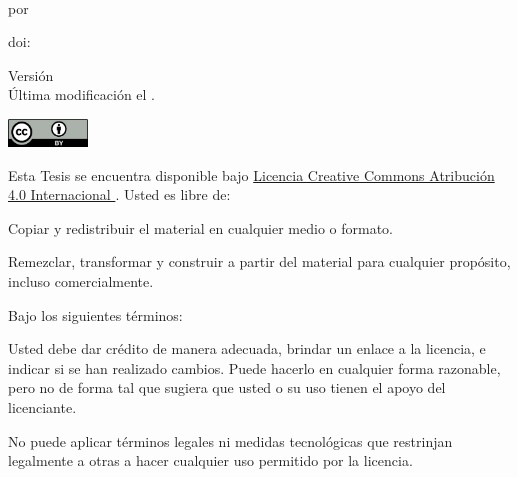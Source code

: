 \documentclass[11pt,a4paper,oneside,openright]{book}
\begin{document}
\title{\Title}
\author{\Soler}
\date{
    \normalsize
}

\frontmatter

\maketitle


\clearpage

\vspace*{\fill}


\noindent \textit{\Title{}} \\
por \Soler{}


\noindent doi: \href{https://doi.org/\ThesisDOI}{\ThesisDOI}

\vspace{4em}


\noindent Versión \ThesisVersion{} \\
Última modificación el .

\vspace{5em}

\noindent \includegraphics[height=2em]{figs/logos/cc-by.png}

\noindent Esta Tesis se encuentra disponible bajo
\href{
    https://creativecommons.org/licenses/by/4.0/deed.es
}{
    Licencia Creative Commons Atribución 4.0 Internacional
}.
Usted es libre de:

\begin{description}[labelindent=0.5cm]
    \item[Compartir:]{
        Copiar y redistribuir el material en cualquier medio o formato.
    }
    \item[Adaptar:]{
        Remezclar, transformar y construir a partir del material
        para cualquier propósito, incluso comercialmente.
    }
\end{description}

\noindent Bajo los siguientes términos:

\begin{description}[labelindent=0.5cm]
    \item[Atribución:]{
        Usted debe dar crédito de manera adecuada, brindar un enlace a la
        licencia, e indicar si se han realizado cambios. Puede hacerlo en cualquier
        forma razonable, pero no de forma tal que sugiera que usted o su uso tienen el
        apoyo del licenciante.
    }
    \item[No hay restricciones adicionales:]{
        No puede aplicar términos legales ni medidas tecnológicas que
        restrinjan legalmente a otras a hacer cualquier uso permitido por la
        licencia.
    }
\end{description}
\end{document}
